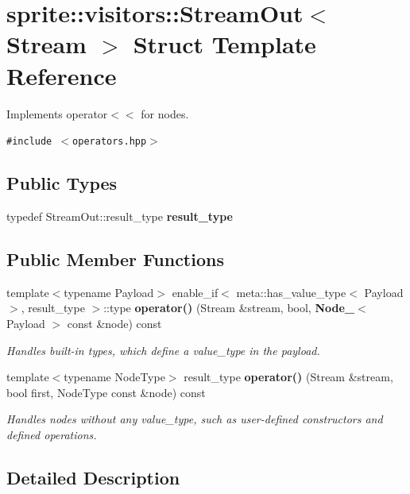 \section{sprite::visitors::Stream\-Out$<$ Stream $>$ Struct Template Reference}
\label{structsprite_1_1visitors_1_1StreamOut}
Implements operator$<$$<$ for nodes.  


{\tt \#include $<$operators.hpp$>$}

\subsection*{Public Types}
\begin{CompactItemize}
\item 
typedef Stream\-Out::result\_\-type {\bf result\_\-type}\label{structsprite_1_1visitors_1_1StreamOut_w0}

\end{CompactItemize}
\subsection*{Public Member Functions}
\begin{CompactItemize}
\item 
template$<$typename Payload$>$ enable\_\-if$<$ meta::has\_\-value\_\-type$<$ Payload $>$, result\_\-type $>$::type {\bf operator()} (Stream \&stream, bool, {\bf Node\_\-}$<$ Payload $>$ const \&node) const 
\begin{CompactList}\small\item\em Handles built-in types, which define a value\_\-type in the payload. \item\end{CompactList}\item 
template$<$typename Node\-Type$>$ result\_\-type {\bf operator()} (Stream \&stream, bool first, Node\-Type const \&node) const \label{structsprite_1_1visitors_1_1StreamOut_a2}

\begin{CompactList}\small\item\em Handles nodes without any value\_\-type, such as user-defined constructors and defined operations. \item\end{CompactList}\end{CompactItemize}


\subsection{Detailed Description}
